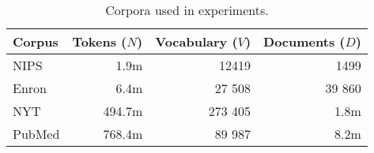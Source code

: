 \begin{table}[ht]
\centering
\begin{tabular}{lrrr}
\hline
Corpus & Tokens ($N$) & Vocabulary ($V$) & Documents ($D$) \\
\hline
  NIPS & 1.9m & 12419 & 1499 \\
  Enron & 6.4m & 27 508 & 39 860 \\
  NYT & 494.7m & 273 405 & 1.8m \\
  PubMed & 768.4m & 89 987 & 8.2m \\
\hline
\end{tabular}
\caption{Corpora used in experiments.}
\label{corpora}
\end{table}
